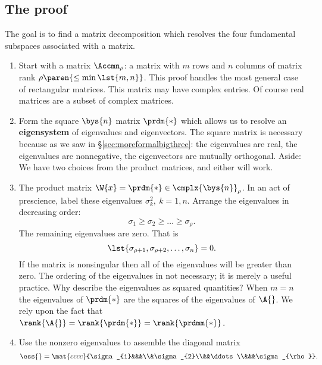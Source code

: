 \subsection{The proof}
The goal is to find a matrix decomposition which resolves the four fundamental subspaces associated with a matrix.
\begin{enumerate}
\item Start with a matrix $\Accmn_{\rho}$: a matrix with $m$ rows and $n$ columns of matrix rank $\rho\paren{\le \min\lst{m,n}}$. 
\subitem This proof handles the most general case of rectangular matrices. 
\subitem This matrix may have complex entries. 
\subitem Of course real matrices are a subset of complex matrices.
\item Form the square $\bys{n}$ matrix $\prdm{*}$ which allows us to resolve an \textbf{eigensystem} of eigenvalues and eigenvectors. The square matrix is necessary because as we saw in \S\eqref{sec:moreformalbigthree}:
\subitem the eigenvalues are real,
\subitem the eigenvalues are nonnegative,
\subitem the eigenvectors are mutually orthogonal.
\subitem Aside: We have two choices from the product matrices, and either will work.
\item The product matrix $\W{x}=\prdm{*}\in\cmplx{\bys{n}}_{\rho}$. In an act of prescience, label these eigenvalues $\sigma_{k}^{2},\ k=1,n$. Arrange the eigenvalues in decreasing order:
\begin{equation}
  \sigma_{1} \ge \sigma_{2} \ge \dots \ge \sigma_{\rho}.
\end{equation}
The remaining eigenvalues are zero. That is
\begin{equation}
  \lst{ \sigma_{\rho+1}, \sigma_{\rho+2}, \dots, \sigma_{n} } = 0.
\end{equation}
\subitem If the matrix is nonsingular then all of the eigenvalues will be greater than zero.
\subitem The ordering of the eigenvalues in not necessary; it is merely a useful practice.
\subitem Why describe the eigenvalues as squared quantities? When $m=n$ the eigenvalues of $\prdm{*}$ are the squares of the eigenvalues of $\A{}$.
\subitem We rely upon the fact that $\rank{\A{}} = \rank{\prdm{*}} = \rank{\prdmm{*}}$.
\item Use the nonzero eigenvalues to assemble the diagonal matrix
\begin{equation}
  \ess{} = \mat{cccc}{\sigma_{1}&&&\\&\sigma_{2}\\&&\ddots\\&&&\sigma_{\rho}}.

\end{equation}
\end{enumerate}
